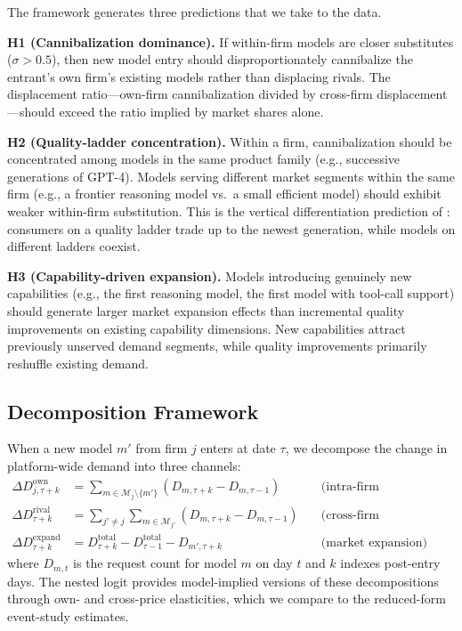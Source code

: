 \documentclass[11pt, a4paper]{article}
\begin{document}
The framework generates three predictions that we take to the data.

\medskip
\noindent \textbf{H1 (Cannibalization dominance).} If within-firm models are closer substitutes ($\sigma > 0.5$), then new model entry should disproportionately cannibalize the entrant's own firm's existing models rather than displacing rivals. The displacement ratio---own-firm cannibalization divided by cross-firm displacement---should exceed the ratio implied by market shares alone.

\medskip
\noindent \textbf{H2 (Quality-ladder concentration).} Within a firm, cannibalization should be concentrated among models in the same product family (e.g., successive generations of GPT-4). Models serving different market segments within the same firm (e.g., a frontier reasoning model vs.\ a small efficient model) should exhibit weaker within-firm substitution. This is the vertical differentiation prediction of \citet{shaked1982relaxing}: consumers on a quality ladder trade up to the newest generation, while models on different ladders coexist.

\medskip
\noindent \textbf{H3 (Capability-driven expansion).} Models introducing genuinely new capabilities (e.g., the first reasoning model, the first model with tool-call support) should generate larger market expansion effects than incremental quality improvements on existing capability dimensions. New capabilities attract previously unserved demand segments, while quality improvements primarily reshuffle existing demand.

\subsection{Decomposition Framework}

When a new model $m'$ from firm $j$ enters at date $\tau$, we decompose the change in platform-wide demand into three channels:
\begin{align}
\Delta D^{\text{own}}_{j,\tau+k} &= \sum_{m \in \mathcal{M}_j \setminus \{m'\}} \left( D_{m,\tau+k} - D_{m,\tau-1} \right) \quad &\text{(intra-firm cannibalization)} \label{eq:own} \\
\Delta D^{\text{rival}}_{\tau+k} &= \sum_{j' \neq j} \sum_{m \in \mathcal{M}_{j'}} \left( D_{m,\tau+k} - D_{m,\tau-1} \right) \quad &\text{(cross-firm displacement)} \label{eq:rival} \\
\Delta D^{\text{expand}}_{\tau+k} &= D^{\text{total}}_{\tau+k} - D^{\text{total}}_{\tau-1} - D_{m',\tau+k} \quad &\text{(market expansion)} \label{eq:expand}
\end{align}
where $D_{m,t}$ is the request count for model $m$ on day $t$ and $k$ indexes post-entry days. The nested logit provides model-implied versions of these decompositions through own- and cross-price elasticities, which we compare to the reduced-form event-study estimates.
\end{document}
